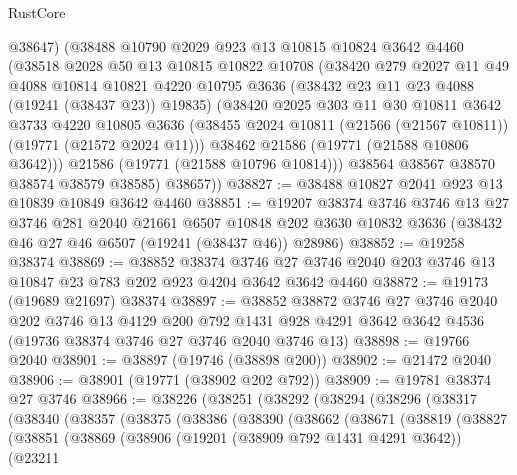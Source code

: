 \begin{lexlean}{RustCore}
\begin{coremodule}
        @38647)
      (@38488
        @10790
        @2029
        @923
        @13
        @10815
        @10824
        @3642
        @4460
        (@38518
          @2028
          @50
          @13
          @10815
          @10822
          @10708
          (@38420
            @279
            @2027
            @11
            @49
            @4088
            @10814
            @10821
            @4220
            @10795
            @3636
            (@38432 @23 @11 @23 @4088 (@19241 (@38437 @23)) @19835)
            (@38420
              @2025
              @303
              @11
              @30
              @10811
              @3642
              @3733
              @4220
              @10805
              @3636
              (@38455 @2024 @10811 (@21566 (@21567 @10811)) (@19771 (@21572 @2024 @11)))
              @38462
              @21586
              (@19771 (@21588 @10806 @3642)))
            @21586
            (@19771 (@21588 @10796 @10814)))
          @38564
          @38567
          @38570
          @38574
          @38579
          @38585)
        @38657))
@38827 := @38488 @10827 @2041 @923 @13 @10839 @10849 @3642 @4460
@38851 := @19207
    @38374
    @3746
    @3746
    @13
    @27
    @3746
    @281
    @2040
    @21661
    @6507
    @10848
    @202
    @3630
    @10832
    @3636
    (@38432 @46 @27 @46 @6507 (@19241 (@38437 @46)) @28986)
@38852 := @19258 @38374
@38869 := @38852
    @38374
    @3746
    @27
    @3746
    @2040
    @203
    @3746
    @13
    @10847
    @23
    @783
    @202
    @923
    @4204
    @3642
    @3642
    @4460
@38872 := @19173 (@19689 @21697) @38374
@38897 := @38852
    @38872
    @3746
    @27
    @3746
    @2040
    @202
    @3746
    @13
    @4129
    @200
    @792
    @1431
    @928
    @4291
    @3642
    @3642
    @4536
    (@19736 @38374 @3746 @27 @3746 @2040 @3746 @13)
@38898 := @19766 @2040
@38901 := @38897 (@19746 (@38898 @200))
@38902 := @21472 @2040
@38906 := @38901 (@19771 (@38902 @202 @792))
@38909 := @19781 @38374 @27 @3746
@38966 := @38226
    (@38251
      (@38292
        (@38294
          (@38296
            (@38317
              (@38340
                (@38357
                  (@38375
                    (@38386
                      (@38390
                        (@38662
                          (@38671
                            (@38819
                              (@38827
                                (@38851
                                  (@38869
                                    (@38906
                                      (@19201 (@38909 @792 @1431 @4291 @3642))
                                      (@23211

\end{coremodule}
\end{lexlean}
